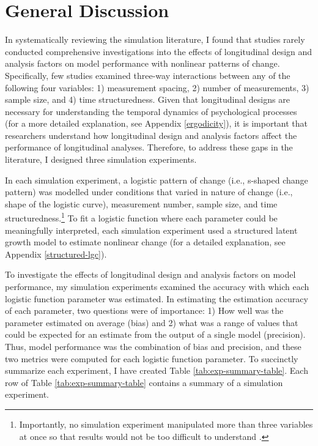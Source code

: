 \documentclass[
12pt, %
twoside,
english]{guelphthesis}
\begin{document}
\hypertarget{general-discussion}{%
\chapter{General Discussion}\label{general-discussion}}

In systematically reviewing the simulation literature, I found that studies rarely conducted comprehensive investigations into the effects of longitudinal design and analysis factors on model performance with nonlinear patterns of change. Specifically, few studies examined three-way interactions between any of the following four variables: 1) measurement spacing, 2) number of measurements, 3) sample size, and 4) time structuredness. Given that longitudinal designs are necessary for understanding the temporal dynamics of psychological processes (for a more detailed explanation, see Appendix \ref{ergodicity}), it is important that researchers understand how longitudinal design and analysis factors affect the performance of longitudinal analyses. Therefore, to address these gaps in the literature, I designed three simulation experiments.

In each simulation experiment, a logistic pattern of change (i.e., s-shaped change pattern) was modelled under conditions that varied in nature of change (i.e., shape of the logistic curve), measurement number, sample size, and time structuredness.\footnote{Importantly, no simulation experiment manipulated more than three variables at once so that results would not be too difficult to understand \parencite{halford2005}.} To fit a logistic function where each parameter could be meaningfully interpreted, each simulation experiment used a structured latent growth model to estimate nonlinear change (for a detailed explanation, see Appendix \ref{structured-lgc}).

To investigate the effects of longitudinal design and analysis factors on model performance, my simulation experiments examined the accuracy with which each logistic function parameter was estimated. In estimating the estimation accuracy of each parameter, two questions were of importance: 1) How well was the parameter estimated on average (bias) and 2) what was a range of values that could be expected for an estimate from the output of a single model (precision). Thus, model performance was the combination of bias and precision, and these two metrics were computed for each logistic function parameter. To succinctly summarize each experiment, I have created Table \ref{tab:exp-summary-table}. Each row of Table \ref{tab:exp-summary-table} contains a summary of a simulation experiment.
\end{document}
